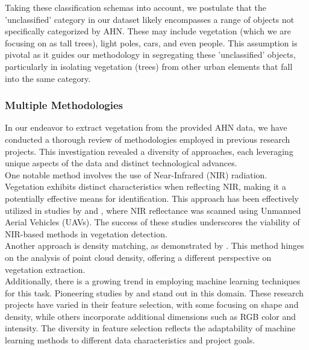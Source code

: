 \documentclass{article}
\begin{document}
\noindent Taking these classification schemas into account, we postulate that the 'unclassified' category in our dataset likely encompasses a range of objects not specifically categorized by AHN. These may include vegetation (which we are focusing on as tall trees), light poles, cars, and even people. This assumption is pivotal as it guides our methodology in segregating these 'unclassified' objects, particularly in isolating vegetation (trees) from other urban elements that fall into the same category.

\subsubsection{Multiple Methodologies}
In our endeavor to extract vegetation from the provided AHN data, we have conducted a thorough review of methodologies employed in previous research projects. This investigation revealed a diversity of approaches, each leveraging unique aspects of the data and distinct technological advances.\\

\noindent One notable method involves the use of Near-Infrared (NIR) radiation. Vegetation exhibits distinct characteristics when reflecting NIR, making it a potentially effective means for identification. This approach has been effectively utilized in studies by  and , where NIR reflectance was scanned using Unmanned Aerial Vehicles (UAVs). The success of these studies underscores the viability of NIR-based methods in vegetation detection.\\

\noindent Another approach is density matching, as demonstrated by . This method hinges on the analysis of point cloud density, offering a different perspective on vegetation extraction.\\

\noindent Additionally, there is a growing trend in employing machine learning techniques for this task. Pioneering studies by  and \cite{ozdemir2019aerial} stand out in this domain. These research projects have varied in their feature selection, with some focusing on shape and density, while others incorporate additional dimensions such as RGB color and intensity. The diversity in feature selection reflects the adaptability of machine learning methods to different data characteristics and project goals.\\
\end{document}
